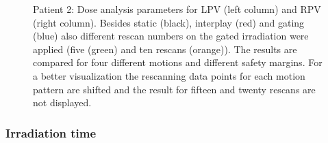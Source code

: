 \documentclass[type=dr, dr=rernat, accentcolor=tud7b,colorbacktitle, bigchapter, openright, twoside, 12pt ]{tudthesis}
\begin{document}
\begin{figure}[H]
{ }
\caption{Patient 2: Dose analysis parameters for LPV (left column) and RPV (right column). Besides static (black), interplay (red) and gating 
(blue) also different rescan numbers on the gated irradiation were applied (five (green) and ten rescans (orange)). The results are compared 
for four different motions and different safety margins. For a better visualization the rescanning data points for each motion pattern are 
shifted and the result for fifteen and twenty rescans are not displayed.}
\label{static_interplay_gating_rescan_Pat02}
\end{figure}

\newpage


\subsubsection{Irradiation time}
\end{document}
